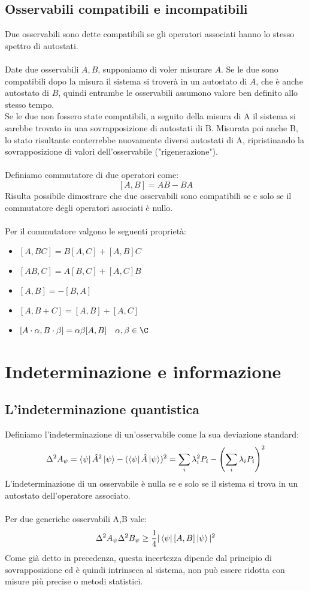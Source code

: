 \documentclass{article}
\begin{document}
\subsection{Osservabili compatibili e incompatibili}
Due osservabili sono dette compatibili se gli operatori associati hanno lo stesso spettro di autostati.\\\\
Date due osservabili $A,B$, supponiamo di voler misurare $A$. Se le due sono compatibili dopo la misura il sistema si troverà in un autostato di $A$, che è anche autostato di $B$, quindi entrambe le osservabili assumono valore ben definito allo stesso tempo.\\
Se le due non fossero state compatibili, a seguito della misura di A il sistema si sarebbe trovato in una sovrapposizione di autostati di B. Misurata poi anche B, lo stato risultante conterrebbe nuovamente diversi autostati di A, ripristinando la sovrapposizione di valori dell'osservabile ("rigenerazione").\\\\
Definiamo commutatore di due operatori come:
$$ [A,B]=AB-BA $$
Risulta possibile dimostrare che due osservabili sono compatibili se e solo se il commutatore degli operatori associati è nullo.\\\\
Per il commutatore valgono le seguenti proprietà:
\begin{itemize}
    \item $[A,BC]=B[A,C]+[A,B]C$
    \item $[AB,C]=A[B,C]+[A,C]B$
    \item $[A,B]=-[B,A]$
    \item  $[A,B+C]=[A,B]+[A,C]$
    \item  $[A\cdot\alpha,B\cdot\beta]=\alpha\beta[A,B] \quad \alpha,\beta\in\C$
\end{itemize}

\newpage
\section{Indeterminazione e informazione}

\subsection{L'indeterminazione quantistica}
Definiamo l'indeterminazione di un'osservabile come la sua deviazione standard:
$$\Delta^2A_\psi=\bra{\psi}\hat{A}^2\ket{\psi}-(\bra{\psi}\hat{A}\ket{\psi})^2=\sum_i\lambda_i^2P_i-\left(\sum_i\lambda_iP_i\right)^2$$
L'indeterminazione di un osservabile è nulla se e solo se il sistema si trova in un autostato dell'operatore associato.\\\\
Per due generiche osservabili A,B vale:
$$ \Delta^2A_\psi\Delta^2B_\psi\geq\frac{1}{4}|\bra{\psi}[A,B]\ket{\psi}|^2 $$
Come già detto in precedenza, questa incertezza dipende dal principio di sovrapposizione ed è quindi intrinseca al sistema, non può essere ridotta con misure più precise o metodi statistici.
\end{document}
